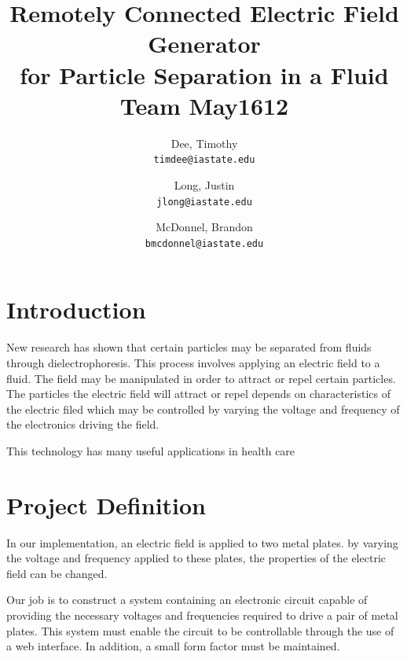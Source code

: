 \documentclass{article}	%
\author{Dee, Timothy\\
    \texttt{timdee@iastate.edu}
    \and
    Long, Justin\\
    \texttt{jlong@iastate.edu}
    \and
    McDonnel, Brandon\\
    \texttt{bmcdonnel@iastate.edu}
}
\title{Remotely Connected Electric Field Generator\\
for Particle Separation in a Fluid \\
\large{Team May1612}}
\begin{document}
\thispagestyle{empty}		%
\maketitle			%

\begin{multicols}{2}


\section{Introduction}
New research has shown that certain particles may be separated from fluids through dielectrophoresis.
This process involves applying an electric field to a fluid.
The field may be manipulated in order to attract or repel certain particles.
The particles the electric field will attract or repel depends on
characteristics of the electric filed which may be controlled
by varying the voltage and frequency of the electronics driving the field.

This technology has many useful applications in health care

\section{Project Definition}
In our implementation, an electric field is applied 
to two metal plates.
by varying the voltage and frequency
applied to these plates, 
the properties of the electric field can be changed.

Our job is to construct a system 
containing an electronic circuit capable of providing
the necessary voltages and frequencies required 
to drive a pair of metal plates.
This system must enable the circuit to be controllable 
through the use of a web interface.
In addition, a small form factor must be maintained.


\end{multicols}
\end{document}
